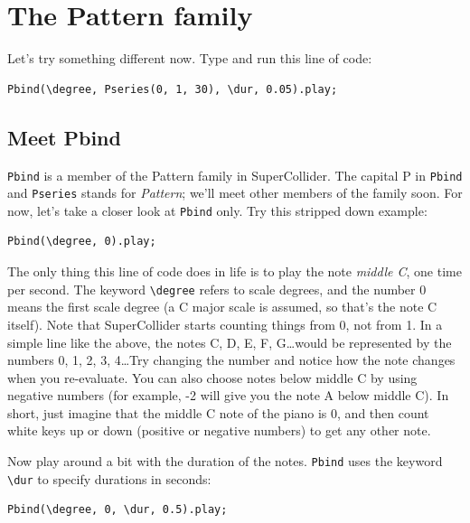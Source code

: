 \section{The Pattern family}

Let's try something different now. Type and run this line of code:

\begin{lstlisting}[style=SuperCollider-IDE, basicstyle=\scttfamily\footnotesize]
Pbind(\degree, Pseries(0, 1, 30), \dur, 0.05).play;
\end{lstlisting}

\subsection{Meet Pbind}

\texttt{Pbind} is a member of the Pattern family in SuperCollider. The capital P in \texttt{Pbind} and \texttt{Pseries} stands for \emph{Pattern}; we'll meet other members of the family soon. For now, let's take a closer look at \texttt{Pbind} only. Try this stripped down example:

\begin{lstlisting}[style=SuperCollider-IDE, basicstyle=\scttfamily\footnotesize]
Pbind(\degree, 0).play;
\end{lstlisting}

The only thing this line of code does in life is to play the note \emph{middle C}, one time per second. The keyword \texttt{\textbackslash degree} refers to scale degrees, and the number 0 means the first scale degree (a C major scale is assumed, so that's the note C itself). Note that SuperCollider starts counting things from 0, not from 1. In a simple line like the above, the notes C, D, E, F, G\dots would be represented by the numbers 0, 1, 2, 3, 4\dots Try changing the number and notice how the note changes when you re-evaluate. You can also choose notes below middle C by using negative numbers (for example, -2 will give you the note A below middle C). In short, just imagine that the middle C note of the piano is 0, and then count white keys up or down (positive or negative numbers) to get any other note.

Now play around a bit with the duration of the notes. \texttt{Pbind} uses the keyword \texttt{\textbackslash dur} to specify durations in seconds:

\begin{lstlisting}[style=SuperCollider-IDE, basicstyle=\scttfamily\footnotesize]
Pbind(\degree, 0, \dur, 0.5).play;
\end{lstlisting}

